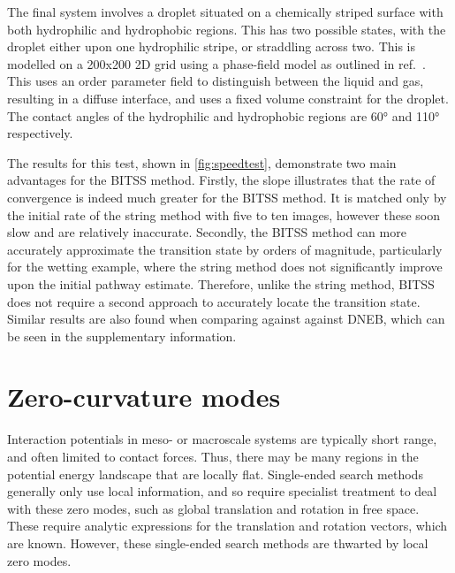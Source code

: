 \documentclass[aps,twocolumn]{revtex4}
\newcommand{\ccite}[1]{ref.~\cite{#1}}
\begin{document}
\topic The final system involves a droplet situated on a chemically striped surface with both hydrophilic and hydrophobic regions.
This has two possible states, with the droplet either upon one hydrophilic stripe, or straddling across two.
This is modelled on a 200x200 2D grid using a phase-field model as outlined in \ccite{Panter2019b}.
This uses an order parameter field to distinguish between the liquid and gas, resulting in a diffuse interface, and uses a fixed volume constraint for the droplet.
The contact angles of the hydrophilic and hydrophobic regions are 60\si{\degree} and 110\si{\degree} respectively.

\topic The results for this test, shown in \cref{fig:speedtest}, demonstrate two main advantages for the BITSS method.
Firstly, the slope illustrates that the rate of convergence is indeed much greater for the BITSS method.
It is matched only by the initial rate of the string method with five to ten images, however these soon slow and are relatively inaccurate.
Secondly, the BITSS method can more accurately approximate the transition state by orders of magnitude, particularly for the wetting example, where the string method does not significantly improve upon the initial pathway estimate.
Therefore, unlike the string method, BITSS does not require a second approach to accurately locate the transition state.
Similar results are also found when comparing against against DNEB, which can be seen in the supplementary information.


\section{Zero-curvature modes}
\topic Interaction potentials in meso- or macroscale systems are typically short range, and often limited to contact forces.
Thus, there may be many regions in the potential energy landscape that are locally flat.
Single-ended search methods generally only use local information, and so require specialist treatment to deal with these zero modes, such as global translation and rotation in free space.
These require analytic expressions for the translation and rotation vectors, which are known.
However, these single-ended search methods are thwarted by local zero modes.
\end{document}

